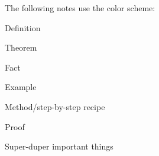 
The following notes use the color scheme:

\begin{Definition}
Definition
\end{Definition}
\begin{Theorem}
Theorem
\end{Theorem}
\begin{Fact}
Fact
\end{Fact}
\begin{Example}
Example
\end{Example}
\begin{Method}
Method/step-by-step recipe
\end{Method}
\begin{Proof}
Proof
\end{Proof}
\begin{VeryImportantStuff}
Super-duper important things
\end{VeryImportantStuff}